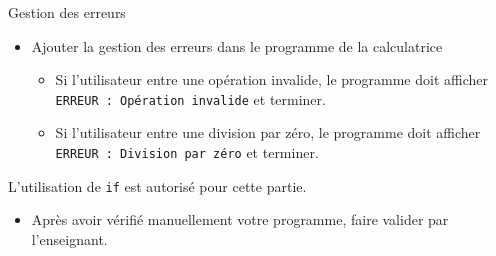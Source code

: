 \begin{UPSTIManipulation}{Gestion des erreurs}
	\begin{itemize}
		\item[$\Box$] Ajouter la gestion des erreurs dans le programme de la calculatrice
		      \begin{itemize}
			      \item Si l'utilisateur entre une opération invalide, le programme doit afficher \texttt{ERREUR : Opération invalide} et terminer.
			      \item Si l'utilisateur entre une division par zéro, le programme doit afficher \texttt{ERREUR : Division par zéro} et terminer.
		      \end{itemize}
	\end{itemize}
	L'utilisation de \texttt{if} est autorisé pour cette partie.
	\begin{itemize}
		\item[$\Box$] Après avoir vérifié manuellement votre programme, faire valider par l'enseignant.
	\end{itemize}
\end{UPSTIManipulation}








